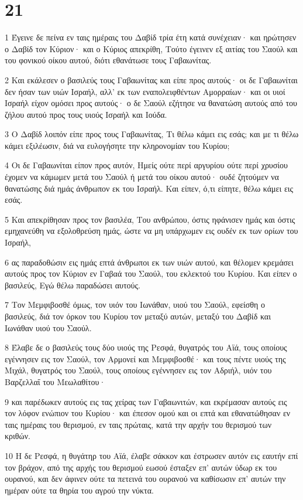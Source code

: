 \chapter{21}

\par 1 Έγεινε δε πείνα εν ταις ημέραις του Δαβίδ τρία έτη κατά συνέχειαν· και ηρώτησεν ο Δαβίδ τον Κύριον· και ο Κύριος απεκρίθη, Τούτο έγεινεν εξ αιτίας του Σαούλ και του φονικού οίκου αυτού, διότι εθανάτωσε τους Γαβαωνίτας.
\par 2 Και εκάλεσεν ο βασιλεύς τους Γαβαωνίτας και είπε προς αυτούς· οι δε Γαβαωνίται δεν ήσαν των υιών Ισραήλ, αλλ' εκ των εναπολειφθέντων Αμορραίων· και οι υιοί Ισραήλ είχον ομόσει προς αυτούς· ο δε Σαούλ εζήτησε να θανατώση αυτούς από του ζήλου αυτού προς τους υιούς Ισραήλ και Ιούδα.
\par 3 Ο Δαβίδ λοιπόν είπε προς τους Γαβαωνίτας, Τι θέλω κάμει εις εσάς; και με τι θέλω κάμει εξιλέωσιν, διά να ευλογήσητε την κληρονομίαν του Κυρίου;
\par 4 Οι δε Γαβαωνίται είπον προς αυτόν, Ημείς ούτε περί αργυρίου ούτε περί χρυσίου έχομεν να κάμωμεν μετά του Σαούλ ή μετά του οίκου αυτού· ουδέ ζητούμεν να θανατώσης διά ημάς άνθρωπον εκ του Ισραήλ. Και είπεν, ό,τι είπητε, θέλω κάμει εις εσάς.
\par 5 Και απεκρίθησαν προς τον βασιλέα, Του ανθρώπου, όστις ηφάνισεν ημάς και όστις εμηχανεύθη να εξολοθρεύση ημάς, ώστε να μη υπάρχωμεν εις ουδέν εκ των ορίων του Ισραήλ,
\par 6 ας παραδοθώσιν εις ημάς επτά άνθρωποι εκ των υιών αυτού, και θέλομεν κρεμάσει αυτούς προς τον Κύριον εν Γαβαά του Σαούλ, του εκλεκτού του Κυρίου. Και είπεν ο βασιλεύς, Εγώ θέλω παραδώσει αυτούς.
\par 7 Τον Μεμφιβοσθέ όμως, τον υιόν του Ιωνάθαν, υιού του Σαούλ, εφείσθη ο βασιλεύς, διά τον όρκον του Κυρίου τον μεταξύ αυτών, μεταξύ του Δαβίδ και Ιωνάθαν υιού του Σαούλ.
\par 8 Έλαβε δε ο βασιλεύς τους δύο υιούς της Ρεσφά, θυγατρός του Αϊά, τους οποίους εγέννησεν εις τον Σαούλ, τον Αρμονεί και Μεμφιβοσθέ· και τους πέντε υιούς της Μιχάλ, θυγατρός του Σαούλ, τους οποίους εγέννησεν εις τον Αδριήλ, υιόν του Βαρζελλαΐ του Μεωλαθίτου·
\par 9 και παρέδωκεν αυτούς εις τας χείρας των Γαβαωνιτών, και εκρέμασαν αυτούς εις τον λόφον ενώπιον του Κυρίου· και έπεσον ομού και οι επτά και εθανατώθησαν εν ταις ημέραις του θερισμού, εν ταις πρώταις, κατά την αρχήν του θερισμού των κριθών.
\par 10 Η δε Ρεσφά, η θυγάτηρ του Αϊά, έλαβε σάκκον και έστρωσεν αυτόν εις εαυτήν επί τον βράχον, από της αρχής του θερισμού εωσού έσταξεν επ' αυτών ύδωρ εκ του ουρανού, και δεν άφινεν ούτε τα πετεινά του ουρανού να καθίσωσιν επ' αυτών την ημέραν ούτε τα θηρία του αγρού την νύκτα.

